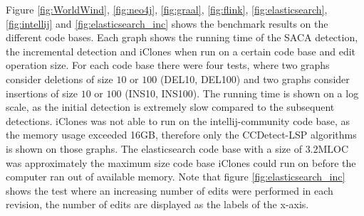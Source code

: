 Figure \ref{fig:WorldWind}, \ref{fig:neo4j}, \ref{fig:graal}, \ref{fig:flink},
\ref{fig:elasticsearch}, \ref{fig:intellij} and \ref{fig:elasticsearch_inc} shows the
benchmark results on the different code bases. Each graph shows the running time of the
SACA detection, the incremental detection and iClones when run on a certain code base and
edit operation size. For each code base there were four tests, where two graphs consider
deletions of size $10$ or $100$ (DEL10, DEL100) and two graphs consider insertions of size
$10$ or $100$ (INS10, INS100). The running time is shown on a log scale, as the initial
detection is extremely slow compared to the subsequent detections. iClones was not able to
run on the intellij-community code base, as the memory usage exceeded 16GB, therefore only
the CCDetect-LSP algorithms is shown on those graphs. The elasticsearch code base with a
size of $3.2\text{MLOC}$ was approximately the maximum size code base iClones could run on
before the computer ran out of available memory. Note that figure
\ref{fig:elasticsearch_inc} shows the test where an increasing number of edits were
performed in each revision, the number of edits are displayed as the labels of the x-axis.

\newpage
\null
\vfill


